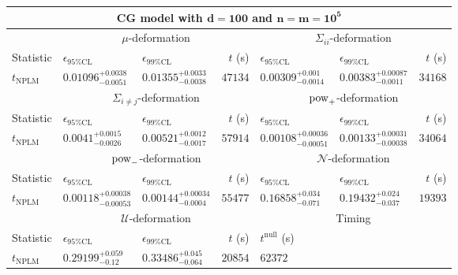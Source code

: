\begin{tabular}{l|llr|llr}
	\toprule
	\multicolumn{7}{c}{{\bf CG model with $\mathbf{d=100}$ and $\mathbf{n=m=10^{5}}$}} \\
	\toprule
	\multicolumn{1}{c}{} & \multicolumn{3}{c}{$\mu$-deformation} & \multicolumn{3}{c}{$\Sigma_{ii}$-deformation} \\
	Statistic & $\epsilon_{95\%\mathrm{CL}}$ & $\epsilon_{99\%\mathrm{CL}}$ & $t$ (s) & $\epsilon_{95\%\mathrm{CL}}$ & $\epsilon_{99\%\mathrm{CL}}$ & $t$ (s) \\
	\midrule
	$t_{\mathrm{NPLM}}$ & $0.01096_{-0.0051}^{+0.0038}$ & $0.01355_{-0.0038}^{+0.0033}$ & $47134$ & $0.00309_{-0.0014}^{+0.001}$ & $0.00383_{-0.0011}^{+0.00087}$ & $34168$ \\
	\toprule
	\multicolumn{1}{c}{} & \multicolumn{3}{c}{$\Sigma_{i\neq j}$-deformation} & \multicolumn{3}{c}{$\rm{pow}_{+}$-deformation} \\
	Statistic & $\epsilon_{95\%\mathrm{CL}}$ & $\epsilon_{99\%\mathrm{CL}}$ & $t$ (s) & $\epsilon_{95\%\mathrm{CL}}$ & $\epsilon_{99\%\mathrm{CL}}$ & $t$ (s) \\
	\midrule
	$t_{\mathrm{NPLM}}$ & $0.0041_{-0.0026}^{+0.0015}$ & $0.00521_{-0.0017}^{+0.0012}$ & $57914$ & $0.00108_{-0.00051}^{+0.00036}$ & $0.00133_{-0.00038}^{+0.00031}$ & $34064$ \\
	\toprule
	\multicolumn{1}{c}{} & \multicolumn{3}{c}{$\rm{pow}_{-}$-deformation} & \multicolumn{3}{c}{$\mathcal{N}$-deformation} \\
	Statistic & $\epsilon_{95\%\mathrm{CL}}$ & $\epsilon_{99\%\mathrm{CL}}$ & $t$ (s) & $\epsilon_{95\%\mathrm{CL}}$ & $\epsilon_{99\%\mathrm{CL}}$ & $t$ (s) \\
	\midrule
	$t_{\mathrm{NPLM}}$ & $0.00118_{-0.00053}^{+0.00038}$ & $0.00144_{-0.0004}^{+0.00034}$ & $55477$ & $0.16858_{-0.071}^{+0.034}$ & $0.19432_{-0.037}^{+0.024}$ & $19393$ \\
	\toprule
	\multicolumn{1}{c}{} & \multicolumn{3}{c}{$\mathcal{U}$-deformation} & \multicolumn{3}{c}{Timing} \\
	Statistic & $\epsilon_{95\%\mathrm{CL}}$ & $\epsilon_{99\%\mathrm{CL}}$ & $t$ (s) & $t^{\mathrm{null}}$ (s) \\
	\midrule
	$t_{\mathrm{NPLM}}$ & $0.29199_{-0.12}^{+0.059}$ & $0.33486_{-0.064}^{+0.045}$ & $20854$ & $62372$ \\
	\bottomrule
\end{tabular}